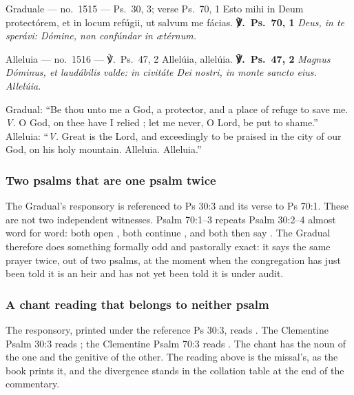 \begin{appointed}{Graduale --- no.\ 1515 --- Ps.\ 30, 3; verse Ps.\ 70, 1}
Esto mihi in Deum protectórem, et in locum refúgii, ut salvum me fácias.
\upshape\textbf{℣.\ Ps.\ 70, 1} \itshape Deus, in te sperávi: Dómine, non
confúndar in ætérnum.
\end{appointed}

\begin{appointed}{Alleluia --- no.\ 1516 --- ℣.\ Ps.\ 47, 2}
Allelúia, allelúia. \upshape\textbf{℣.\ Ps.\ 47, 2} \itshape Magnus Dóminus, et
laudábilis valde: in civitáte Dei nostri, in monte sancto eius. Allelúia.
\end{appointed}

\begin{englishwitness}
Gradual: ``Be thou unto me a God, a protector, and a place of refuge to save
me. \emph{V.} O God, on thee have I relied ; let me never, O Lord, be put to
shame.'' Alleluia: ``\emph{V.} Great is the Lord, and exceedingly to be praised
in the city of our God, on his holy mountain. Alleluia. Alleluia.''
\end{englishwitness}

\subsubsection*{Two psalms that are one psalm twice}

The Gradual's responsory is referenced to Ps 30:3 and its verse to Ps 70:1.
These are not two independent witnesses. Psalm 70:1--3 repeats Psalm 30:2--4
almost word for word: both open , both continue , and both then say
. The Gradual
therefore does something formally odd and pastorally exact: it says the same
prayer twice, out of two psalms, at the moment when the congregation has just
been told it is an heir and has not yet been told it is under audit.

\subsubsection*{A chant reading that belongs to neither psalm}

The responsory, printed under the reference Ps 30:3, reads . The Clementine Psalm 30:3 reads ; the
Clementine Psalm 70:3 reads . The chant has the noun of
the one and the genitive of the other. The reading above is the missal's, as the
book prints it, and the divergence stands in the collation table at the end of
the commentary.

